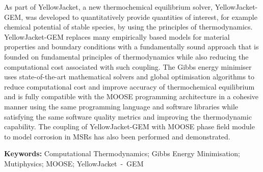 As part of YellowJacket, a new thermochemical equilibrium solver, YellowJacket-GEM, was developed to quantitatively provide quantities of interest, for example chemical potential of stable species, by using the principles of thermodynamics. YellowJacket-GEM replaces many empirically based models for material properties and boundary conditions with a fundamentally sound approach that is founded on fundamental principles of thermodynamics while also reducing the computational cost associated with such coupling. The Gibbs energy minimiser uses state-of-the-art mathematical solvers and  global optimisation algorithms to reduce computational cost and improve accuracy of thermochemical equilibrium and is fully compatible with the MOOSE programming architecture in a cohesive manner using the same programming language and software libraries while satisfying the same software quality metrics and improving the thermodynamic capability. The coupling of YellowJacket-GEM with MOOSE phase field module to model corrosion in MSRs has also been performed and demonstrated.



\bigskip
\bigskip
\bigskip
\bigskip

\noindent
\textbf{Keywords:} Computational Thermodynamics; Gibbs Energy Minimisation; Mutiphysics; MOOSE; YellowJacket~-~GEM
